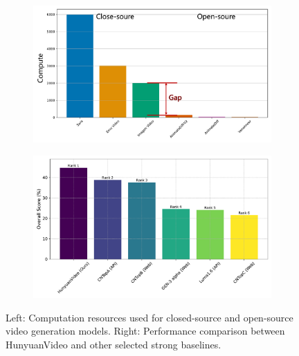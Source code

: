 \documentclass{article}
\newcommand{\nameofmethod}{HunyuanVideo}
\begin{document}
\begin{figure}[h]
    \centering
    \begin{subfigure}[b]{0.47\textwidth}
        \centering
        \includegraphics[width=\textwidth]{figures/compute_resource_v1.pdf} 
    \end{subfigure}
    \begin{subfigure}[b]{0.45\textwidth}
        \centering
        \includegraphics[width=\textwidth]{figures/ranking.pdf} 
    \end{subfigure}
    \label{fig:side_by_side}
    \caption{Left: Computation resources used for closed-source and open-source video generation models. Right: Performance comparison between \nameofmethod{} and other selected strong baselines.}
\end{figure}
\end{document}
